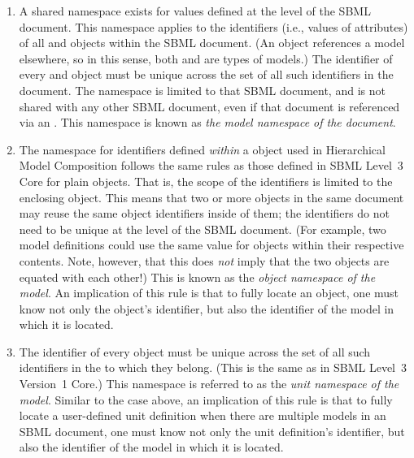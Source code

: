 \begin{enumerate}

\item A shared namespace exists for  values defined at the
  level of the SBML document.  This namespace applies to the identifiers
  (i.e., values of  attributes) of all \Model and
  \ExternalModelDefinition objects within the SBML document.  (An
  \ExternalModelDefinition object references a model elsewhere, so in
  this sense, both \Model and \ExternalModelDefinition are types of
  models.)  The identifier of every \Model and \ExternalModelDefinition
  object must be unique across the set of all such identifiers in the
  document.  The namespace is limited to that SBML document, and is not
  shared with any other SBML document, even if that document is
  referenced via an \ExternalModelDefinition.  This namespace is known
  as \emph{the model namespace of the document}.

\item The namespace for  identifiers defined \emph{within}
  a \Model object used in Hierarchical Model Composition follows the
  same rules as those defined in SBML Level~3 Core for plain \Model
  objects.  That is, the scope of the identifiers is limited to the
  enclosing \Model object.  This means that two or more \Model objects
  in the same document may reuse the same object identifiers inside of
  them; the identifiers do not need to be unique at the level of the
  SBML document.  (For example, two model definitions could use the same
   value for \Parameter objects within their respective
  contents.  Note, however, that this does \emph{not} imply that the two
  objects are equated with each other!)  This is known as the
  \emph{object namespace of the model}.  An implication of this rule is
  that to fully locate an object, one must know not only the object's
  identifier, but also the identifier of the model in which it is
  located.

\item The identifier of every \UnitDefinition object must be unique
  across the set of all such identifiers in the \Model to which they
  belong.  (This is the same as in SBML Level~3 Version~1 Core.)  This
  namespace is referred to as the \emph{unit namespace of the model}.
  Similar to the case above, an implication of this rule is that to
  fully locate a user-defined unit definition when there are multiple
  models in an SBML document, one must know not only the unit
  definition's identifier, but also the identifier of the model in which
  it is located.


\end{enumerate}
